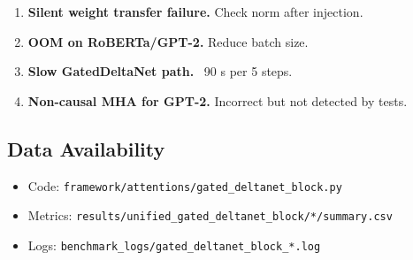 \begin{enumerate}
\item \textbf{Silent weight transfer failure.} Check norm after injection.
\item \textbf{OOM on RoBERTa/GPT-2.} Reduce batch size.
\item \textbf{Slow GatedDeltaNet path.} ~90 s per 5 steps.
\item \textbf{Non-causal MHA for GPT-2.} Incorrect but not detected by tests.

\end{enumerate}
\subsection{Data Availability}

\begin{itemize}
\item Code: \texttt{framework/attentions/gated\_deltanet\_block.py}
\item Metrics: \texttt{results/unified\_gated\_deltanet\_block/*/summary.csv}
\item Logs: \texttt{benchmark\_logs/gated\_deltanet\_block\_*.log}

\end{itemize}
